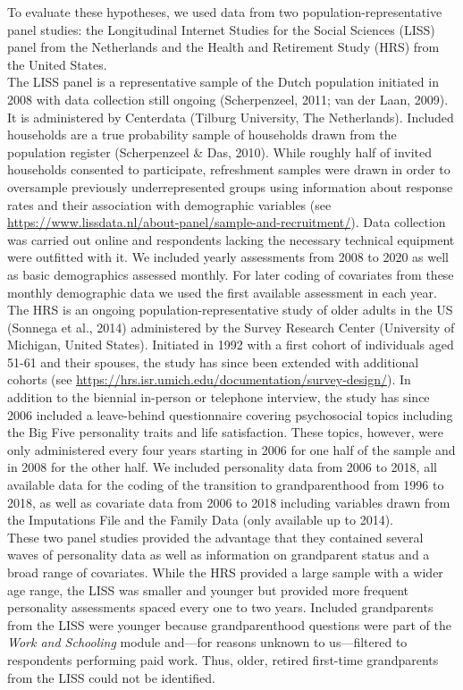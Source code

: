 \documentclass[
  english,
  man, noextraspace]{apa7}
\begin{document}
To evaluate these hypotheses, we used data from two population-representative panel studies: the Longitudinal Internet Studies for the Social Sciences (LISS) panel from the Netherlands and the Health and Retirement Study (HRS) from the United States.\\
The LISS panel is a representative sample of the Dutch population initiated in 2008 with data collection still ongoing (Scherpenzeel, 2011; van der Laan, 2009). It is administered by Centerdata (Tilburg University, The Netherlands). Included households are a true probability sample of households drawn from the population register (Scherpenzeel \& Das, 2010). While roughly half of invited households consented to participate, refreshment samples were drawn in order to oversample previously underrepresented groups using information about response rates and their association with demographic variables (see \url{https://www.lissdata.nl/about-panel/sample-and-recruitment/}). Data collection was carried out online and respondents lacking the necessary technical equipment were outfitted with it. We included yearly assessments from 2008 to 2020 as well as basic demographics assessed monthly. For later coding of covariates from these monthly demographic data we used the first available assessment in each year.\\
The HRS is an ongoing population-representative study of older adults in the US (Sonnega et al., 2014) administered by the Survey Research Center (University of Michigan, United States). Initiated in 1992 with a first cohort of individuals aged 51-61 and their spouses, the study has since been extended with additional cohorts (see \url{https://hrs.isr.umich.edu/documentation/survey-design/}). In addition to the biennial in-person or telephone interview, the study has since 2006 included a leave-behind questionnaire covering psychosocial topics including the Big Five personality traits and life satisfaction. These topics, however, were only administered every four years starting in 2006 for one half of the sample and in 2008 for the other half. We included personality data from 2006 to 2018, all available data for the coding of the transition to grandparenthood from 1996 to 2018, as well as covariate data from 2006 to 2018 including variables drawn from the Imputations File and the Family Data (only available up to 2014).\\
These two panel studies provided the advantage that they contained several waves of personality data as well as information on grandparent status and a broad range of covariates. While the HRS provided a large sample with a wider age range, the LISS was smaller and younger but provided more frequent personality assessments spaced every one to two years. Included grandparents from the LISS were younger because grandparenthood questions were part of the \emph{Work and Schooling} module and---for reasons unknown to us---filtered to respondents performing paid work. Thus, older, retired first-time grandparents from the LISS could not be identified.
\end{document}
